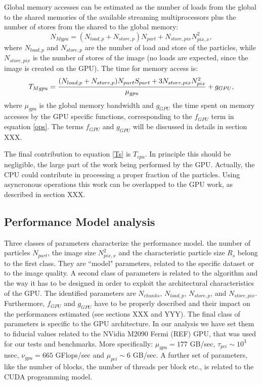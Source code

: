 \documentclass[11pt]{article}
\begin{document}
Global memory accesses can be estimated 
as the number of loads from the global to the shared memories of the available 
streaming multiprocessors plus the number of stores from the shared to the global memory: 
\begin{equation}
N_{Mgpu} = (N_{load,p} + N_{store,p}) N_{part} + N_{store,pix} N_{pix,x}^2,
\end{equation}
where $N_{load,p}$ and $N_{store,p}$ are the number of load and store of the 
particles, while $N_{store,pix}$ is the number of stores of the image (no loads 
are expected, since the image is created on the GPU). 
The time for memory access is:
\begin{equation}\label{tmgpu}
T_{Mgpu} = {(N_{load,p} + N_{store,p}) N_{part} S_{part} 
+ 3 N_{store,pix} N_{pix}^2\over \mu_{gpu}}
+ g_{GPU},
\end{equation}
where $\mu_{gpu}$ is the global memory bandwidth and $g_{GPU}$ the time 
spent on memory accesses by the GPU specific
functions, corresponding to the $f_{GPU}$ term in equation \eqref{ops}.
The terms $f_{GPU}$ and $g_{GPU}$ will be discussed in details in section XXX.

The final contribution to equation \eqref{Ts} is $T_{cpu}$. In principle this should be negligible, 
the large part of the work being performed by the GPU. Actually, the CPU
could contribute in processing a proper fraction of the particles. Using
asyncronous operations this work can be overlapped 
to the GPU work, as described in section XXX.

\subsection{Performance Model analysis}

Three classes of parameters characterize the performance model.
the number of particles $N_{part}$,
the image size $N_{pix,x}^2$ and the characteristic particle size $R_s$ belong to
the first class. They 
are ``model" parameters, related to the specific dataset or to the image quality.
A second class of parameters is related to the algorithm and the way 
it has to be designed in order to exploit the architectural characteristics
of the GPU. The identified parameters are $N_{chunks}$, $N_{load,p}$, 
$N_{store,p}$,  and $N_{store,pix}$. Furthermore, $f_{GPU}$ and 
$g_{GPU}$ have to be properly described and their impact on the performances
estimated (see sections XXX and YYY). The final class of parameters 
is specific to the GPU architecture. In our analysis we have set them to fiducial
values related to the NVidia M2090 Fermi (REF) GPU, that was used for our
tests and benchmarks. More specifically: 
$\mu_{gpu} = 177$ GB/sec, $\tau_{pci} \sim 10^3$ nsec, $\nu_{gpu} = 665$ GFlops/sec and
$\mu_{pci} \sim 6$ GB/sec.
A further set of parameters, like the number of blocks, the number of threads per block etc., 
is related to the CUDA progeamming model. 
\end{document}
